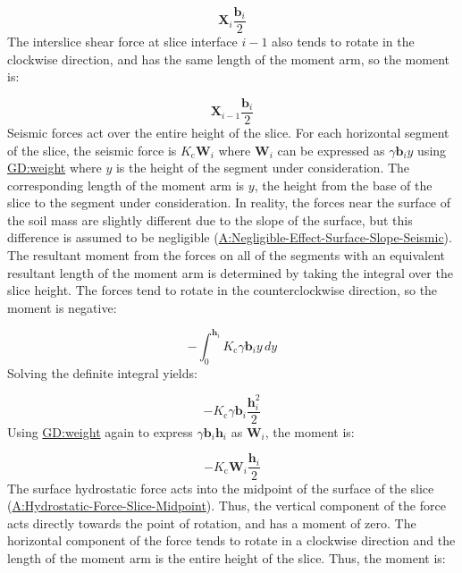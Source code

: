 \documentclass[12pt]{article}
\begin{document}
\begin{displaymath}
{\symbf{X}}_{i} \frac{{\symbf{b}}_{i}}{2}
\end{displaymath}
The interslice shear force at slice interface $i-1$ also tends to rotate in the clockwise direction, and has the same length of the moment arm, so the moment is:

\begin{displaymath}
{\symbf{X}}_{i-1} \frac{{\symbf{b}}_{i}}{2}
\end{displaymath}
Seismic forces act over the entire height of the slice. For each horizontal segment of the slice, the seismic force is ${K_{\text{c}}} {\symbf{W}}_{i}$ where ${\symbf{W}}_{i}$ can be expressed as $γ {\symbf{b}}_{i} y$ using \hyperref[GD:weight]{GD:weight} where $y$ is the height of the segment under consideration. The corresponding length of the moment arm is $y$, the height from the base of the slice to the segment under consideration. In reality, the forces near the surface of the soil mass are slightly different due to the slope of the surface, but this difference is assumed to be negligible (\hyperref[assumpNESSS]{A:Negligible-Effect-Surface-Slope-Seismic}). The resultant moment from the forces on all of the segments with an equivalent resultant length of the moment arm is determined by taking the integral over the slice height. The forces tend to rotate in the counterclockwise direction, so the moment is negative:

\begin{displaymath}
-\int_{0}^{{\symbf{h}}_{i}}{{K_{\text{c}}} γ {\symbf{b}}_{i} y}\,dy
\end{displaymath}
Solving the definite integral yields:

\begin{displaymath}
-{K_{\text{c}}} γ {\symbf{b}}_{i} \frac{{\symbf{h}}_{i}^{2}}{2}
\end{displaymath}
Using \hyperref[GD:weight]{GD:weight} again to express $γ {\symbf{b}}_{i} {\symbf{h}}_{i}$ as ${\symbf{W}}_{i}$, the moment is:

\begin{displaymath}
-{K_{\text{c}}} {\symbf{W}}_{i} \frac{{\symbf{h}}_{i}}{2}
\end{displaymath}
The surface hydrostatic force acts into the midpoint of the surface of the slice (\hyperref[assumpHFSM]{A:Hydrostatic-Force-Slice-Midpoint}). Thus, the vertical component of the force acts directly towards the point of rotation, and has a moment of zero. The horizontal component of the force tends to rotate in a clockwise direction and the length of the moment arm is the entire height of the slice. Thus, the moment is:
\end{document}
